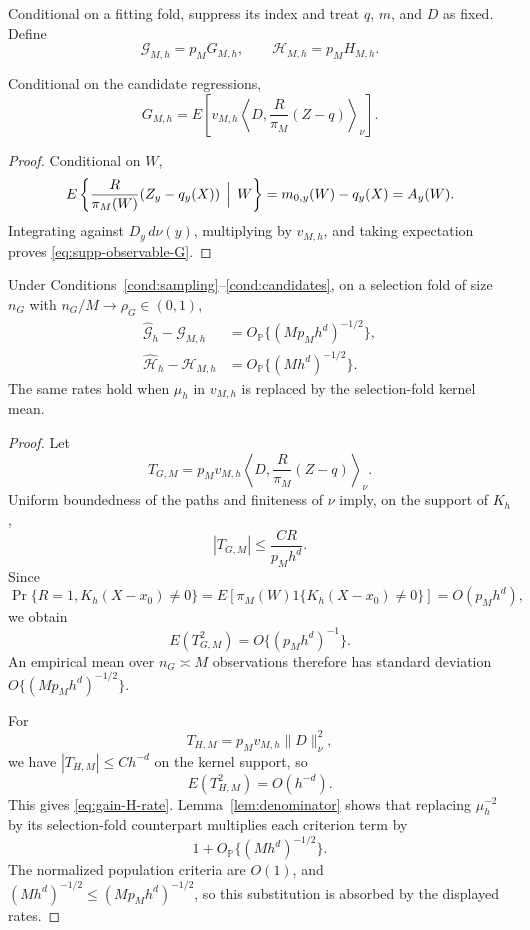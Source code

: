 Conditional on a fitting fold, suppress its index and treat \(q\), \(m\), and \(D\) as fixed. Define
\[
\mathcal G_{M,h}=p_MG_{M,h},
\qquad
\mathcal H_{M,h}=p_MH_{M,h}.
\]

\begin{lemma}
\label{lem:observable-G}
Conditional on the candidate regressions,
\begin{equation}
G_{M,h}
=
E\left[
 v_{M,h}
 \left\langle
 D,\frac{R}{\pi_M}(Z-q)
 \right\rangle_\nu
\right].
\label{eq:supp-observable-G}
\end{equation}
\end{lemma}

\begin{proof}
Conditional on \(W\),
\[
E\left\{
\frac{R}{\pi_M(W)}(Z_y-q_y(X))
\,\Bigm|\,W
\right\}
=m_{0,y}(W)-q_y(X)=A_y(W).
\]
Integrating against \(D_y\,d\nu(y)\), multiplying by \(v_{M,h}\), and taking expectation proves \eqref{eq:supp-observable-G}.
\end{proof}

\begin{lemma}
\label{lem:gain-rates}
Under Conditions~\ref{cond:sampling}--\ref{cond:candidates}, on a selection fold of size \(n_G\) with \(n_G/M\to\rho_G\in(0,1)\),
\begin{align}
\widehat{\mathcal G}_{h}-\mathcal G_{M,h}
&=O_{\mathbb P}\{(Mp_Mh^d)^{-1/2}\},
\label{eq:gain-G-rate}\\
\widehat{\mathcal H}_{h}-\mathcal H_{M,h}
&=O_{\mathbb P}\{(Mh^d)^{-1/2}\}.
\label{eq:gain-H-rate}
\end{align}
The same rates hold when \(\mu_h\) in \(v_{M,h}\) is replaced by the selection-fold kernel mean.
\end{lemma}

\begin{proof}
Let
\[
T_{G,M}
=
p_Mv_{M,h}
\left\langle
D,\frac{R}{\pi_M}(Z-q)
\right\rangle_\nu.
\]
Uniform boundedness of the paths and finiteness of \(\nu\) imply, on the support of \(K_h\),
\[
|T_{G,M}|
\le
\frac{CR}{p_Mh^d}.
\]
Since
\[
\Pr\{R=1,K_h(X-x_0)\ne0\}
=E[\pi_M(W)1\{K_h(X-x_0)\ne0\}]
=O(p_Mh^d),
\]
we obtain
\[
E(T_{G,M}^2)=O\{(p_Mh^d)^{-1}\}.
\]
An empirical mean over \(n_G\asymp M\) observations therefore has standard deviation \(O\{(Mp_Mh^d)^{-1/2}\}\).

For
\[
T_{H,M}=p_Mv_{M,h}\|D\|_\nu^2,
\]
we have \(|T_{H,M}|\le Ch^{-d}\) on the kernel support, so
\[
E(T_{H,M}^2)=O(h^{-d}).
\]
This gives \eqref{eq:gain-H-rate}. Lemma~\ref{lem:denominator} shows that replacing \(\mu_h^{-2}\) by its selection-fold counterpart multiplies each criterion term by
\[
1+O_{\mathbb P}\{(Mh^d)^{-1/2}\}.
\]
The normalized population criteria are \(O(1)\), and \((Mh^d)^{-1/2}\le(Mp_Mh^d)^{-1/2}\), so this substitution is absorbed by the displayed rates.
\end{proof}

